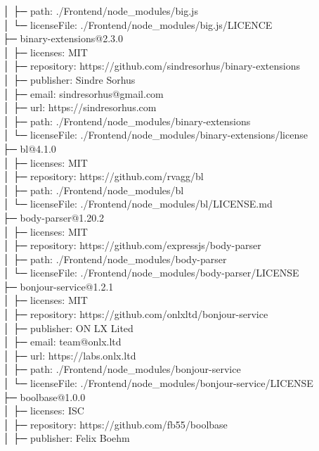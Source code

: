 │  ├─ path: ./Frontend/node\_modules/big.js\\
│  └─ licenseFile: ./Frontend/node\_modules/big.js/LICENCE\\
├─ binary-extensions@2.3.0\\
│  ├─ licenses: MIT\\
│  ├─ repository: https://github.com/sindresorhus/binary-extensions\\
│  ├─ publisher: Sindre Sorhus\\
│  ├─ email: sindresorhus@gmail.com\\
│  ├─ url: https://sindresorhus.com\\
│  ├─ path: ./Frontend/node\_modules/binary-extensions\\
│  └─ licenseFile: ./Frontend/node\_modules/binary-extensions/license\\
├─ bl@4.1.0\\
│  ├─ licenses: MIT\\
│  ├─ repository: https://github.com/rvagg/bl\\
│  ├─ path: ./Frontend/node\_modules/bl\\
│  └─ licenseFile: ./Frontend/node\_modules/bl/LICENSE.md\\
├─ body-parser@1.20.2\\
│  ├─ licenses: MIT\\
│  ├─ repository: https://github.com/expressjs/body-parser\\
│  ├─ path: ./Frontend/node\_modules/body-parser\\
│  └─ licenseFile: ./Frontend/node\_modules/body-parser/LICENSE\\
├─ bonjour-service@1.2.1\\
│  ├─ licenses: MIT\\
│  ├─ repository: https://github.com/onlxltd/bonjour-service\\
│  ├─ publisher: ON LX Lited\\
│  ├─ email: team@onlx.ltd\\
│  ├─ url: https://labs.onlx.ltd\\
│  ├─ path: ./Frontend/node\_modules/bonjour-service\\
│  └─ licenseFile: ./Frontend/node\_modules/bonjour-service/LICENSE\\
├─ boolbase@1.0.0\\
│  ├─ licenses: ISC\\
│  ├─ repository: https://github.com/fb55/boolbase\\
│  ├─ publisher: Felix Boehm\\
